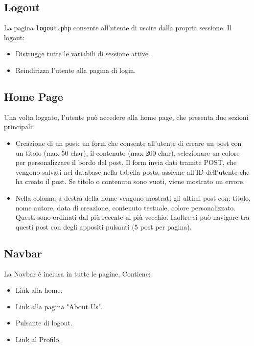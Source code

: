 \documentclass{article}
\theoremstyle{mytheoremstyle}
\theoremstyle{mytheoremstyle}
\theoremstyle{myproblemstyle}
\begin{document}
    \subsection{Logout}
    La pagina \texttt{logout.php} consente all’utente di uscire dalla propria sessione. Il logout:
    \begin{itemize}
        \item Distrugge tutte le variabili di sessione attive.
        \item Reindirizza l’utente alla pagina di login.
    \end{itemize}

    \subsection{Home Page}
      Una volta loggato, l'utente può accedere alla home page, che presenta due sezioni principali:
      \begin{itemize}
        \item Creazione di un post: un form che consente all'utente di creare un post con un titolo (max 50 char), il contenuto (max 200 char),
          selezionare un colore per personalizzare il bordo del post.
          Il form invia dati tramite POST, che vengono salvati nel database nella tabella posts, assieme all'ID dell'utente che ha creato il post. Se titolo o contenuto sono vuoti, viene mostrato un errore.
        \item Nella colonna a destra della home vengono mostrati gli ultimi post con: titolo, nome autore, data di creazione,
          contenuto testuale, colore personalizzato.
          Questi sono ordinati dal più recente al più vecchio. Inoltre si può navigare tra questi post con degli appositi pulsanti (5 post per pagina).
      \end{itemize}

    \subsection{Navbar}
      La Navbar è inclusa in tutte le pagine, Contiene:
      \begin{itemize}
        \item Link alla home.
        \item Link alla pagina "About Us".
        \item Pulsante di logout.
        \item Link al Profilo.
      \end{itemize}
\end{document}
